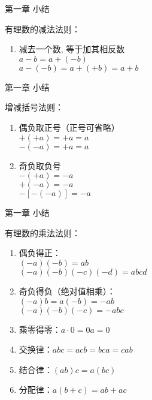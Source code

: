 \documentclass[aspectratio=169]{ctexbeamer} %
\begin{document}
\begin{frame}[t]{第一章 小结}
\begin{spacing}{1.5}
\Large
有理数的减法法则：\\
\begin{enumerate}[label={\arabic*.}]
\item 减去一个数, 等于加其相反数\\
$ a - b = a + (-b)$ \\
$ a - (-b) = a + (+b) = a + b$ \\
\end{enumerate}
\end{spacing}
\end{frame}


\begin{frame}[t]{第一章 小结}
\begin{spacing}{1.2}
\normalsize
增减括号法则：
\begin{enumerate}[label={\arabic*.}]
\item 偶负取正号（正号可省略） \\
$+(+a) = +a = a$ \\
$-(-a) = +a = a$ 
\item 奇负取负号 \\
$-(+a) = -a$ \\
$+(-a) = -a$ \\
$-[-(-a)] = -a$
\end{enumerate}

\end{spacing}
\end{frame}

\begin{frame}[t]{第一章 小结}
\begin{spacing}{1.2}
\normalsize
有理数的乘法法则：
\begin{enumerate}[label={\arabic*.}]
\item 偶负得正：\\
\vspace{0.5cm}
$(-a)(-b)= ab$ \\ 
\vspace{0.5cm}
$(-a)(-b)(-c)(-d)  = abcd$
\item 奇负得负（绝对值相乘）：\\
\vspace{0.5cm}
$(-a)b = a(-b) = -ab$ \\
\vspace{0.5cm}
$(-a)(-b)(-c)  = -abc$
\item 乘零得零：$ a \cdot 0  =  0a = 0$
\item 交换律：$abc = acb = bca = cab$
\item 结合律：$(ab)c = a(bc)$
\item 分配律：$a(b + c) = ab + ac$
\end{enumerate}

\end{spacing}
\end{frame}
\end{document}
